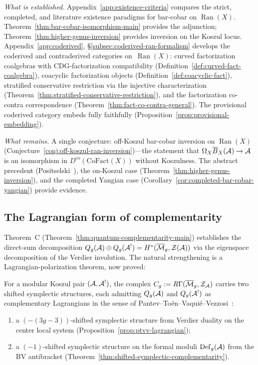 \emph{What is established.}
Appendix~\ref{app:existence-criteria} compares the strict,
completed, and literature existence paradigms for bar-cobar on
$\operatorname{Ran}(X)$.  Theorem~\ref{thm:bar-cobar-isomorphism-main}
provides the adjunction; Theorem~\ref{thm:higher-genus-inversion}
provides inversion on the Koszul locus.
Appendix~\ref{app:coderived},
\S\ref{subsec:coderived-ran-formalism} develops the coderived
and contraderived categories on~$\operatorname{Ran}(X)$: curved
factorization coalgebras with CDG-factorization compatibility
(Definition~\ref{def:curved-fact-coalgebra}), coacyclic
factorization objects
(Definition~\ref{def:coacyclic-fact}), stratified conservative
restriction via the injective characterization
(Theorem~\ref{thm:stratified-conservative-restriction}),
and the factorization co-contra correspondence
(Theorem~\ref{thm:fact-co-contra-general}).  The provisional
coderived category embeds fully faithfully
(Proposition~\ref{prop:provisional-embedding}).

\emph{What remains.}
A single conjecture: off-Koszul bar-cobar inversion on
$\operatorname{Ran}(X)$
(Conjecture~\ref{conj:off-koszul-ran-inversion})---the statement
that $\Omega_X \overline{B}_X(\mathcal{A}) \to \mathcal{A}$ is an isomorphism in
$D^{\mathrm{co}}(\mathrm{CoFact}(X))$ without Koszulness.  The
abstract precedent (Positselski~\cite[Theorem~7.2]{Positselski11}),
the on-Koszul case (Theorem~\ref{thm:higher-genus-inversion}), and
the completed Yangian case
(Corollary~\ref{cor:completed-bar-cobar-yangian}) provide evidence.

\subsection{The Lagrangian form of complementarity}

Theorem~C (Theorem~\ref{thm:quantum-complementarity-main}) establishes
the direct-sum decomposition
$Q_g(\mathcal{A}) \oplus Q_g(\mathcal{A}^!)
= H^*(\overline{\mathcal{M}}_g, \mathcal{Z}(\mathcal{A}))$
via the eigenspace decomposition of the Verdier involution.
The natural strengthening is a Lagrangian-polarization theorem,
now proved:

\begin{theorem}\label{thm:lagrangian-complementarity}
For a modular Koszul pair $(\mathcal{A}, \mathcal{A}^!)$,
the complex
$C_g := R\Gamma(\overline{\mathcal{M}}_g, \mathcal{Z}_{\mathcal{A}})$
carries two shifted symplectic structures, each admitting
$Q_g(\mathcal{A})$ and $Q_g(\mathcal{A}^!)$ as complementary Lagrangians in the
sense of Pantev--To\"en--Vaqui\'e--Vezzosi~\cite{PTVV13}:
\begin{enumerate}[label=\textup{(\roman*)}]
\item a $(-(3g{-}3))$-shifted symplectic structure from
  Verdier duality on the center local system
  \textup{(}Proposition~\textup{\ref{prop:ptvv-lagrangian}}\textup{)};
\item a $(-1)$-shifted symplectic structure on the formal moduli
  $\mathrm{Def}_g(\mathcal{A})$ from the BV antibracket
  \textup{(}Theorem~\textup{\ref{thm:shifted-symplectic-complementarity}}\textup{)}.
\end{enumerate}
\end{theorem}

